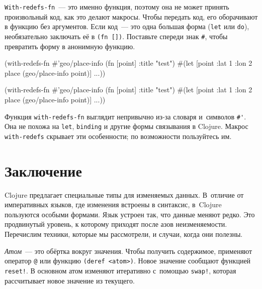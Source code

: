 \fi


\verb|With-redefs-fn|~--- это именно функция, поэтому она не может принять
произвольный код, как это делают макросы. Чтобы передать код, его оборачивают в
функцию без аргументов. Если код~--- это одна большая форма (\verb|let| или
\verb|do|), необязательно заключать её в \verb|(fn [])|. Поставьте спереди
знак \verb|#|, чтобы превратить форму в анонимную функцию.

\ifx\DEVICETYPE\MOBILE

\begin{english}
  \begin{clojure}
(with-redefs-fn
  {#'geo/place-info (fn [point]
                      {:title "test"})}
  #(let [point {:lat 1 :lon 2}
         place (geo/place-info point)]
     ...))
  \end{clojure}
\end{english}

\else

\begin{english}
  \begin{clojure}
(with-redefs-fn
  {#'geo/place-info (fn [point] {:title "test"})}
  #(let [point {:lat 1 :lon 2}
         place (geo/place-info point)]
     ...))
  \end{clojure}
\end{english}

\fi

Функция \verb|with-redefs-fn| выглядит непривычно из-за словаря и~символов
\verb|#'|. Она не похожа на \verb|let|, \verb|binding| и другие формы
связывания в Clojure. Макрос \verb|with-redefs| скрывает эти особенности; по
возможности пользуйтесь им.

\section{Заключение}

Clojure предлагает специальные типы для изменяемых данных. В~отличие от
императивных языков, где изменения встроены в синтаксис, в~Clojure пользуются
особыми формами. Язык устроен так, что данные меняют редко. Это продвинутый
уровень, к которому приходят после азов неизменяемости. Перечислим техники,
которые мы рассмотрели, и случаи, когда они полезны.

\emph{Атом}~--- это обёртка вокруг значения. Чтобы получить содержимое,
применяют оператор \verb|@| или функцию \verb|(deref <atom>)|. Новое
значение сообщают функцией \verb|reset!|. В основном атом изменяют итеративно
с~помощью \verb|swap!|, которая рассчитывает новое значение из текущего.

